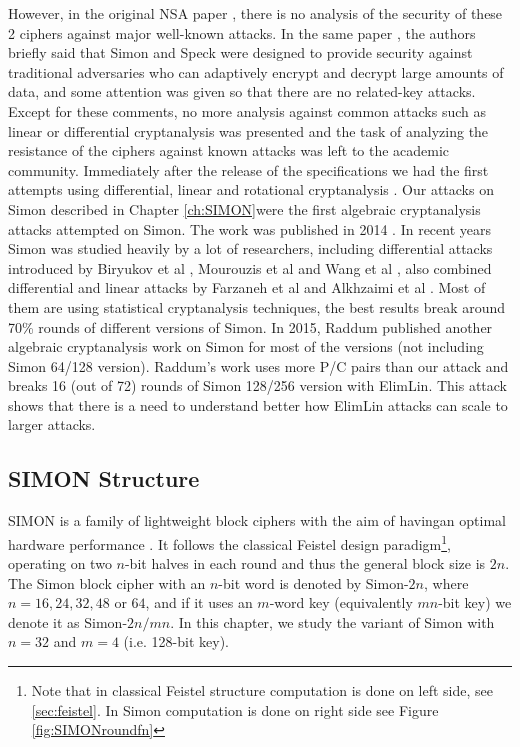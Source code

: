 However, in the original NSA paper \cite{NSAciphers}, there is no analysis of the security of these 2 ciphers against major well-known attacks. In the same paper \cite{NSAciphers}, the authors briefly said that Simon and Speck were designed to provide security against traditional adversaries who can adaptively encrypt and decrypt large amounts of data, and some attention was given so that there are no related-key attacks. Except for these comments, no more analysis against common attacks such as linear or differential cryptanalysis was presented and the task of analyzing the resistance of the ciphers against known attacks was left to the academic community. Immediately after the release of the specifications we had the first attempts using differential, linear and rotational cryptanalysis \cite{simon1,simon2}. Our attacks on Simon described in Chapter \ref{ch:SIMON}were the first algebraic cryptanalysis attacks attempted on Simon. The work was published in 2014 \cite{courtois2014combined}. In recent years Simon was studied heavily by a lot of researchers, including differential attacks introduced by Biryukov et al \cite{simon3}, Mourouzis et al \cite{SIMON6} and Wang et al \cite{SIMON4, SIMON5}, also combined differential and linear attacks by Farzaneh et al \cite{simon1} and Alkhzaimi et al \cite{simon2}. Most of them are using statistical cryptanalysis techniques, the best results break around 70\% rounds of different versions of Simon. In 2015, Raddum \cite{raddum2006new} published another algebraic cryptanalysis work on Simon for most of the versions (not including Simon 64/128 version). Raddum's work uses more P/C pairs than our attack and breaks 16 (out of 72) rounds of Simon 128/256 version with ElimLin.  This attack shows that there is a need to understand better how ElimLin attacks can scale to larger attacks. 

\subsection{SIMON Structure}
SIMON is a family of lightweight block ciphers with the aim of havingan  optimal hardware performance \cite{NSAciphers}.
It follows the classical Feistel design paradigm\footnote{Note that in classical Feistel structure computation is done on left side, see \ref{sec:feistel}. In Simon computation is done on right side see Figure \ref{fig:SIMONroundfn}}, operating on two
$n$-bit halves in each round and thus the general block size is $2n$.
The Simon block cipher with an $n$-bit word is denoted by Simon-$2n$, where
$n=16,24,32,48$ or $64$, and if it uses an $m$-word key (equivalently $mn$-bit
key) we denote it as Simon-$2n/mn$. In this chapter, we study the variant of
Simon with $n=32$ and $m=4$ (i.e. 128-bit key).

